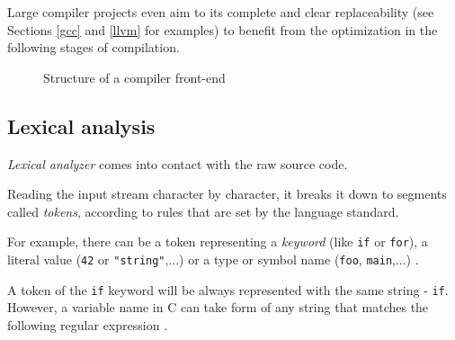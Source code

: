         Large compiler projects even aim to its complete and clear replaceability (see Sections \ref{gcc} and \ref{llvm} for examples) to benefit from the optimization in the following stages of compilation.

        \begin{figure}[H]
        \centering
        \caption{Structure of a compiler front-end} \label{fig:frontend}
        \end{figure}

        \subsection{Lexical analysis}

            \emph{Lexical analyzer} comes into contact with the raw source code.

            Reading the input stream character by character, it breaks it down to segments called \emph{tokens}, according to rules that are set by the language standard.

            For example, there can be a token representing a \emph{keyword} (like \texttt{if} or \texttt{for}), a literal value (\texttt{42} or \verb'"string"',...) or a type or symbol name (\texttt{foo}, \texttt{main},...) \cite{DragonBook}.

            A token of the \texttt{if} keyword will be always represented with the same string - \texttt{if}. However, a variable name in C can take form of any string that matches the following regular expression \cite{C99}.

